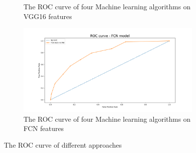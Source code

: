 \begin{figure}
\begin{subfigure}[b]{0.45\textwidth}
         \caption{The ROC curve of four Machine learning algorithms on VGG16 features}
         \label{fig:ROC_vgg}
     \end{subfigure}
     \hfill
     \begin{subfigure}[b]{.45\textwidth}
         \centering
         \includegraphics[width=1\textwidth]{manuscript/src/figures/project/roc_curve_FCN 2021-04-09-11:12:24-tree-Mobnet-standardization.png}
         \caption{The ROC curve of four Machine learning algorithms on FCN features}
         \label{fig:ROC_fcn}
     \end{subfigure} 
        \caption{The ROC curve of different approaches}
        \label{fig:ROC}
\end{figure}

